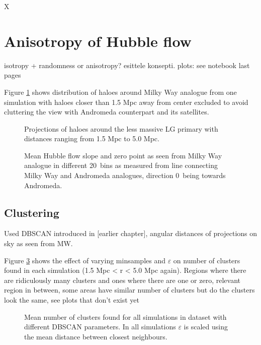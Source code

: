 \documentclass[english, oneside]{HYgradu}
\begin{document}
X\section{Anisotropy of Hubble flow}
isotropy + randomness or anisotropy? esittele konsepti. plots: see notebook last pages

\reversemarginpar
{}
Figure \ref{fig:mollweide-anisotropy} shows distribution of haloes around Milky Way analogue from one simulation with haloes closer than 1.5 Mpc away from center excluded to avoid cluttering the view with Andromeda counterpart and its satellites.

\begin{figure}
    \centering
    
    \caption{Projections of haloes around the less massive LG primary with distances ranging from 1.5 Mpc to 5.0 Mpc.}\label{fig:mollweide-anisotropy}
\end{figure}

\begin{figure}
    \centering
    
    \caption{Mean Hubble flow slope and zero point as seen from Milky Way analogue in different 20\textdegree\ bins as measured from line connecting Milky Way and Andromeda analogues, direction 0\textdegree\ being towards Andromeda.}\label{fig:directionalHF}
\end{figure}

\subsection{Clustering}
Used DBSCAN introduced in [earlier chapter], angular distances of projections on sky as seen from MW.

Figure \ref{fig:clusteringparameters} shows the effect of varying minsamples and $\varepsilon$ on number of clusters found in each simulation (1.5 Mpc < r < 5.0 Mpc again). Regions where there are ridiculously many clusters and ones where there are one or zero, relevant region in between, some areas have similar number of clusters but do the clusters look the same, see plots that don't exist yet

\begin{figure}
    \centering
    
    \caption{Mean number of clusters found for all simulations in dataset with different DBSCAN parameters. In all simulations $\varepsilon$ is scaled using the mean distance between closest neighbours.}\label{fig:clusteringparameters}
\end{figure}
\end{document}
